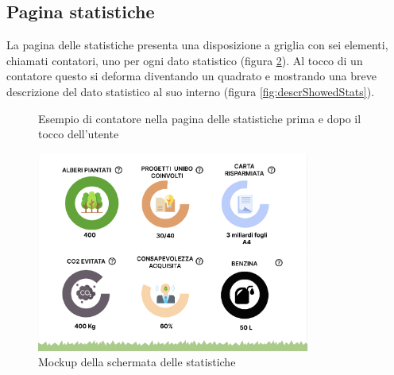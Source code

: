 \subsection{Pagina statistiche}
La pagina delle statistiche presenta una disposizione a griglia con sei elementi, chiamati contatori, uno per ogni dato statistico (figura \ref{fig:statsPage}). Al tocco di un contatore questo si deforma diventando un quadrato e mostrando una breve descrizione del dato statistico al suo interno (figura \ref{fig:descrShowedStats}).

\begin{figure} [h]
    \centering
    \caption{Esempio di contatore nella pagina delle statistiche prima e dopo il tocco dell'utente}
    \label{fig:statCircle}
\end{figure}

\begin{figure}
    \centering
    \includegraphics[width=0.8\textwidth]{img/statsPage.png}
    \caption{Mockup della schermata delle statistiche}
    \label{fig:statsPage}
\end{figure}
%
%
